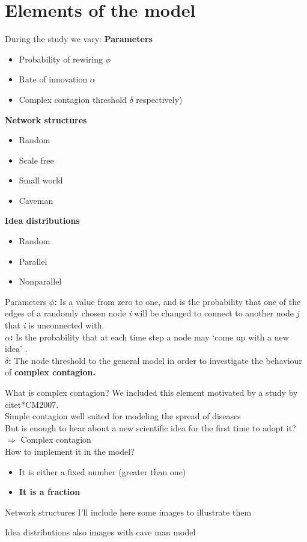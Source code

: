 \documentclass{beamer}
\begin{document}
\section{Elements of the model}
%
\begin{frame}
{During the study we vary:} 
\textbf{Parameters}
\begin{itemize}
\item Probability of rewiring $\phi$
\item Rate of innovation $\alpha$
\item Complex contagion threshold  $\delta$ respectively) 
\end{itemize} \pause
\textbf{Network structures}
\begin{itemize}
\item Random
\item Scale free
\item Small world
\item Caveman
\end{itemize}\pause
\textbf{Idea distributions}
\begin{itemize}
\item Random
\item Parallel
\item Nonparallel
\end{itemize}
\end{frame}
%
\begin{frame}
{Parameters}
\textbf{$\phi$:} Is a value from zero to one, and is the probability that one of the edges of a randomly chosen node \emph{i} will be changed to connect to another node \emph{j} that \emph{i} is unconnected with.\\ \pause
\textbf{$\alpha$:} Is the probability that at each time step a node may `come up with a new idea' .\\ \pause
\textbf{$\delta$:} The node threshold  to the general model in order to investigate the behaviour of \textbf{complex contagion.}
\end{frame}
%
\begin{frame}
{What is complex contagion?}
We included this element motivated by a study by \alert{citet*{CM2007}}. \\ \pause
Simple contagion well suited for modeling the spread of diseases \\ \pause
But is enough to hear about a new scientific idea for the first time to adopt it? \\ \pause
$\Rightarrow$ Complex contagion \\\pause
How to implement it in the model?\pause
\begin{itemize}
\item It is either a fixed number (greater than one)\pause
\item \textbf{It is a fraction}
\end{itemize}

\end{frame}
%
\begin{frame}
{Network structures}
\alert{I'll include here some images to illustrate them}
\end{frame}
%
\begin{frame}
{Idea distributions}
\alert{also images with cave man model}
\end{frame}
%
\end{document}
